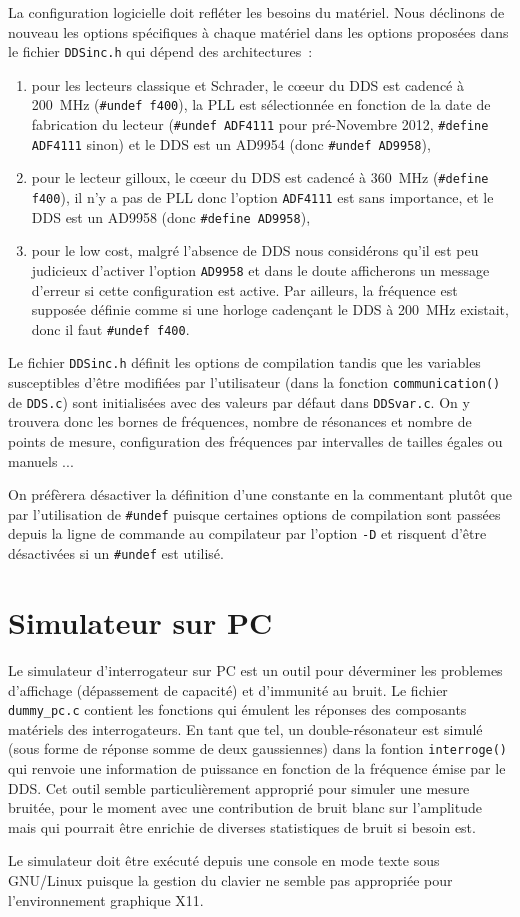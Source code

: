 \documentclass[a4paper]{article}
\begin{document}
La configuration logicielle doit refl\'eter les besoins du mat\'eriel. Nous d\'eclinons de nouveau
les options sp\'ecifiques \`a chaque mat\'eriel dans les options propos\'ees dans le fichier
{\tt DDSinc.h} qui d\'epend des architectures~:
\begin{enumerate}
\item pour les lecteurs classique et Schrader, le c\oe eur du DDS est cadenc\'e \`a 200~MHz ({\tt \#undef f400}),
la PLL est s\'electionn\'ee en fonction de la date de fabrication du lecteur ({\tt \#undef ADF4111} pour
pr\'e-Novembre 2012, {\tt \#define ADF4111} sinon) et le DDS est un AD9954 (donc {\tt \#undef AD9958}),
\item pour le lecteur gilloux, le c\oe eur du DDS est cadenc\'e \`a 360~MHz ({\tt \#define f400}), il
n'y a pas de PLL donc l'option {\tt ADF4111} est sans importance, et le DDS est un AD9958 (donc {\tt \#define AD9958}),
\item pour le low cost, malgr\'e l'absence de DDS nous consid\'erons qu'il est peu judicieux d'activer l'option
{\tt AD9958} et dans le doute afficherons un message d'erreur si cette configuration est active. Par ailleurs, la
fr\'equence est suppos\'ee d\'efinie comme si une horloge caden\c cant le DDS \`a 200~MHz existait, donc il
faut {\tt \#undef f400}.
\end{enumerate}

Le fichier {\tt DDSinc.h} d\'efinit les options de compilation tandis que les variables susceptibles d'\^etre
modifi\'ees par l'utilisateur (dans la fonction {\tt communication()} de {\tt DDS.c}) sont initialis\'ees avec
des valeurs par d\'efaut dans {\tt DDSvar.c}. On y trouvera donc les bornes de fr\'equences, nombre de r\'esonances
et nombre de points de mesure, configuration des fr\'equences par intervalles de tailles \'egales ou manuels ...

On pr\'ef\`erera d\'esactiver la d\'efinition d'une constante en la commentant plut\^ot que par l'utilisation
de {\tt \#undef} puisque certaines options de compilation sont pass\'ees depuis la ligne de commande au compilateur
par l'option {\tt -D} et risquent d'\^etre d\'esactiv\'ees si un {\tt \#undef} est utilis\'e.

\section{Simulateur sur PC}

Le simulateur d'interrogateur sur PC est un outil pour d\'everminer les problemes d'affichage (d\'epassement de
capacit\'e) et d'immunit\'e au bruit. Le fichier {\tt dummy\_pc.c} contient les fonctions qui \'emulent
les r\'eponses des composants mat\'eriels des interrogateurs. En tant que tel, un double-r\'esonateur est simul\'e (sous forme de
r\'eponse somme de deux gaussiennes) dans la fontion {\tt interroge()} qui renvoie une information de puissance en 
fonction de la fr\'equence \'emise par le DDS. Cet outil semble particuli\`erement appropri\'e pour simuler une mesure
bruit\'ee, pour le moment avec une contribution de bruit blanc sur l'amplitude mais qui pourrait \^etre enrichie de
diverses statistiques de bruit si besoin est.

Le simulateur doit \^etre ex\'ecut\'e depuis une console en mode texte sous GNU/Linux puisque la gestion du clavier
ne semble pas appropri\'ee pour l'environnement graphique X11.
\end{document}
